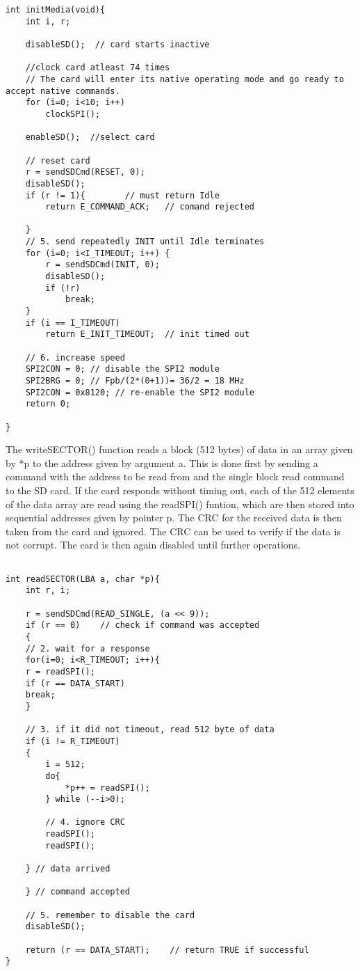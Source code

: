 \documentclass[12pt]{article}
\begin{document}
\begin{lstlisting}
int initMedia(void){
	int i, r;

	disableSD();  // card starts inactive

	//clock card atleast 74 times
	// The card will enter its native operating mode and go ready to accept native commands.
	for (i=0; i<10; i++)
		clockSPI();
		
	enableSD();  //select card

	// reset card
	r = sendSDCmd(RESET, 0);
	disableSD();
	if (r != 1){        // must return Idle
		return E_COMMAND_ACK;   // comand rejected

    }
	// 5. send repeatedly INIT until Idle terminates
	for (i=0; i<I_TIMEOUT; i++) {
		r = sendSDCmd(INIT, 0);
		disableSD();
		if (!r) 
			break; 
	} 
	if (i == I_TIMEOUT)   
		return E_INIT_TIMEOUT;  // init timed out 

	// 6. increase speed 
    SPI2CON = 0; // disable the SPI2 module
    SPI2BRG = 0; // Fpb/(2*(0+1))= 36/2 = 18 MHz
    SPI2CON = 0x8120; // re-enable the SPI2 module
    return 0; 
          
}
\end{lstlisting}
The writeSECTOR() function reads a block (512 bytes) of data in an array given by *p to the address given by argument a. This is done first by sending a command with the address to be read from and the single block read command to the SD card. If the card responds without timing out, each of the 512 elements of the data array are read using the readSPI() funtion, which are then stored into sequential addresses given by pointer p. The CRC for the received data is then taken from the card and ignored. The CRC can be used to verify if the data is not corrupt. The card is then again disabled until further operations.
\begin{lstlisting}

int readSECTOR(LBA a, char *p){
	int r, i;

	r = sendSDCmd(READ_SINGLE, (a << 9));
	if (r == 0)    // check if command was accepted
	{  
	// 2. wait for a response
	for(i=0; i<R_TIMEOUT; i++){
	r = readSPI();     
	if (r == DATA_START) 
	break;
	} 

	// 3. if it did not timeout, read 512 byte of data
	if (i != R_TIMEOUT)
	{
		i = 512;
		do{ 
			*p++ = readSPI();
		} while (--i>0);

		// 4. ignore CRC
		readSPI();
		readSPI();

	} // data arrived

	} // command accepted

	// 5. remember to disable the card
	disableSD();

	return (r == DATA_START);    // return TRUE if successful
}
\end{lstlisting}
\end{document}
